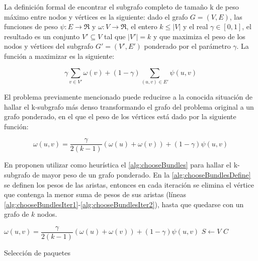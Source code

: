 La definición formal de encontrar el subgrafo completo de tamaño k de peso máximo entre nodos y vértices es la siguiente: dado el grafo $ G = (V,E) $, las funciones de peso $\psi : E \rightarrow \Re$ y $\omega : V \rightarrow \Re$, el entero $ k \leq |V| $ y el real $\gamma \in [0,1]$, el resultado es un conjunto $V' \subseteq V$ tal que $|V'| = k$ y que maximiza el peso de los nodos y vértices del subgrafo $G' = (V', E')$ ponderado por el parámetro $\gamma$. La función a maximizar es la siguiente:

\begin{equation}
\gamma \sum_{v \in V'}{\omega(v)} + (1 - \gamma) \sum_{(u,v) \in E'}{\psi(u,v)}
\end{equation}

El problema previamente mencionado puede reducirse a la conocida situación de hallar el k-subgrafo más denso \cite{DBLP:journals/algorithmica/FeigePK01} transformando el grafo del problema original a un grafo ponderado, en el que el peso de los vértices está dado por la siguiente función:
 
\begin{equation}
\omega(u,v) = \dfrac{\gamma}{2( k - 1)} (\omega(u) + \omega(v)) + (1 - \gamma)\psi(u,v) 
\end{equation}

En \cite{journals/tkde/Amer-YahiaBCFMZ14} proponen utilizar como heurística el \autoref{alg:chooseBundles} para hallar el k-subgrafo de mayor peso de un grafo ponderado. En la \autoref{alg:chooseBundlesDefine} se definen los pesos de las aristas, entonces en cada iteración se elimina el vértice que contenga la menor suma de pesos de sus aristas (líneas \ref{alg:chooseBundlesIter1}-\ref{alg:chooseBundlesIter2}), hasta que quedarse con un grafo de $k$ nodos.

\begin{center}
	\begin{algorithm}[H]
	\DontPrintSemicolon
	\SetAlgoLined
		$\omega(u,v) = \dfrac{\gamma}{2( k - 1)} (\omega(u) + \omega(v)) + (1 - \gamma)\psi(u,v)$\;\label{alg:chooseBundlesDefine}
		$S \leftarrow V$\;
		\Return $C$\;
	\caption{Selección de paquetes}\label{alg:chooseBundles}
	\end{algorithm}
\end{center}

